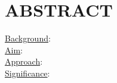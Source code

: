 
\section{ABSTRACT}
\uline{Background}: \\

\noindent\uline{Aim}: \\


\noindent\uline{Approach}: \\


\noindent\uline{Significance}: 